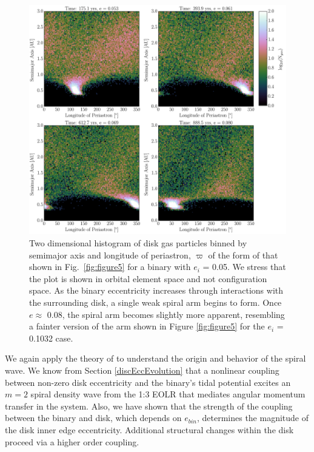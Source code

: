 \begin{figure}
	\includegraphics[width=\textwidth]{f6.pdf} %
    \caption{Two dimensional histogram of disk gas particles binned by semimajor axis and
longitude of periastron, $\varpi$ of the form of that shown in Fig.~\ref{fig:figure5} for a binary with $e_i$ = 0.05.  We stress that the plot is shown in orbital 
element space and not configuration space.  As the binary eccentricity increases through 
interactions with the surrounding disk, a single weak spiral arm begins to form.  Once $e \approx$ 0.08, the spiral arm becomes slightly more apparent, 
resembling a fainter version of the arm shown in Figure \ref{fig:figure5} for the $e_i$ = 0.1032 case.}
    \label{fig:figure6}
\end{figure}

We again apply the theory of \citet{Papaloizou01} to understand the origin and behavior of the spiral wave.  We know from Section \ref{discEccEvolution} that a nonlinear coupling between non-zero disk eccentricity and the binary's tidal potential excites an $m = 2$ spiral density wave from the 1:3 EOLR that mediates angular momentum transfer in the system.  Also, we have shown that the strength of the coupling between the binary and disk, which depends on $e_{bin}$, determines the magnitude of the disk inner edge eccentricity.  Additional structural changes within the disk proceed via a higher order coupling.  

